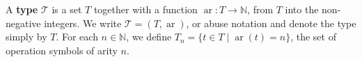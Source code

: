 A \textbf{type} $\mathcal{T}$ is a set $T$ together with a function $\operatorname{ar}: T \rightarrow \mathbb{N}$, from $T$ into the non-negative integers. We write $\mathcal{T} = (T, \operatorname{ar})$, or abuse notation and denote the type simply by $T$. For each $n \in \mathbb{N}$, we define $T_n = \{t \in T \mid \operatorname{ar}(t) = n\}$, the set of operation symbols of arity $n$.
